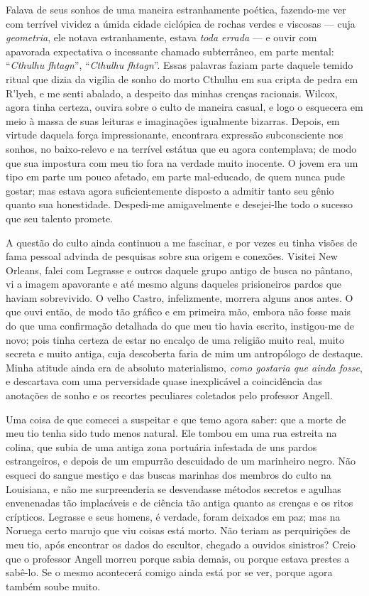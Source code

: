 Falava de seus sonhos de uma maneira estranhamente poética, fazendo-me
ver com terrível vividez a úmida cidade ciclópica de rochas verdes e
viscosas --- cuja
\emph{geometria}, ele notava estranhamente, estava \emph{toda errada}
--- e ouvir com apavorada expectativa o incessante chamado subterrâneo,
em parte mental: ``\emph{Cthulhu fhtagn}'', ``\emph{Cthulhu fhtagn}''.
Essas palavras faziam parte daquele temido ritual que dizia da vigília
de sonho do morto Cthulhu em sua cripta de pedra em R'lyeh, e me senti
abalado, a despeito das minhas crenças racionais. Wilcox, agora tinha
certeza, ouvira sobre o culto de maneira casual, e logo o esquecera em
meio à massa de suas leituras e imaginações igualmente bizarras. Depois,
em virtude daquela força impressionante, encontrara expressão
subconsciente nos sonhos, no baixo-relevo e na terrível estátua que eu
agora contemplava; de modo que sua impostura com meu tio fora na verdade
muito inocente. O jovem era um tipo em parte um pouco afetado, em parte
mal-educado, de quem nunca pude gostar; mas estava agora suficientemente
disposto a admitir tanto seu gênio quanto sua honestidade. Despedi-me
amigavelmente e desejei-lhe todo o sucesso que seu talento promete.

A questão do culto ainda continuou a me fascinar, e por vezes eu tinha
visões de fama pessoal advinda de pesquisas sobre sua origem e conexões.
Visitei New Orleans, falei com Legrasse e outros daquele grupo antigo de
busca no pântano, vi a imagem apavorante e até mesmo alguns daqueles
prisioneiros pardos que haviam sobrevivido. O velho Castro,
infelizmente, morrera alguns anos antes. O que ouvi então, de modo tão
gráfico e em primeira mão, embora não fosse mais do que uma confirmação
detalhada do que meu tio havia escrito, instigou-me de novo; pois tinha
certeza de estar no encalço de uma religião muito real, muito secreta e
muito antiga, cuja descoberta faria de mim um antropólogo de destaque.
Minha atitude ainda era de absoluto materialismo, \emph{como gostaria
que ainda fosse}, e descartava com uma perversidade quase inexplicável a
coincidência das anotações de sonho e os recortes peculiares coletados
pelo professor Angell.

Uma coisa de que comecei a suspeitar e que temo agora saber: que a
morte de meu tio tenha sido tudo menos natural. Ele tombou em uma rua
estreita na colina, que subia de uma antiga zona portuária infestada de
uns pardos estrangeiros, e depois de um empurrão descuidado de um
marinheiro negro. Não esqueci do sangue mestiço e das buscas marinhas
dos membros do culto na Louisiana, e não me surpreenderia se desvendasse
métodos secretos e agulhas envenenadas tão implacáveis e de ciência tão
antiga quanto as crenças e os ritos crípticos. Legrasse e seus homens, é
verdade, foram deixados em paz; mas na Noruega certo marujo que viu
coisas está morto. Não teriam as perquirições de meu tio, após encontrar
os dados do escultor, chegado a ouvidos sinistros? Creio que o professor
Angell morreu porque sabia demais, ou porque estava prestes a sabê-lo.
Se o mesmo acontecerá comigo ainda está por se ver, porque agora também
soube muito.


